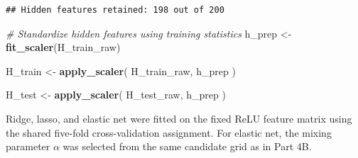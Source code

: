 \documentclass[
  11pt,
]{article}
\newenvironment{Shaded}{\begin{snugshade}}{\end{snugshade}}
\newcommand{\CommentTok}[1]{\textcolor[rgb]{0.56,0.35,0.01}{\textit{#1}}}
\newcommand{\FunctionTok}[1]{\textcolor[rgb]{0.13,0.29,0.53}{\textbf{#1}}}
\newcommand{\NormalTok}[1]{#1}
\newcommand{\OtherTok}[1]{\textcolor[rgb]{0.56,0.35,0.01}{#1}}
\begin{document}
\begin{verbatim}
## Hidden features retained: 198 out of 200
\end{verbatim}

\begin{Shaded}
\begin{Highlighting}[]
\CommentTok{\# Standardize hidden features using training statistics}
\NormalTok{h\_prep }\OtherTok{\textless{}{-}} \FunctionTok{fit\_scaler}\NormalTok{(H\_train\_raw)}

\NormalTok{H\_train }\OtherTok{\textless{}{-}} \FunctionTok{apply\_scaler}\NormalTok{(}
\NormalTok{  H\_train\_raw,}
\NormalTok{  h\_prep}
\NormalTok{)}

\NormalTok{H\_test }\OtherTok{\textless{}{-}} \FunctionTok{apply\_scaler}\NormalTok{(}
\NormalTok{  H\_test\_raw,}
\NormalTok{  h\_prep}
\NormalTok{)}
\end{Highlighting}
\end{Shaded}

Ridge, lasso, and elastic net were fitted on the fixed ReLU feature
matrix using the shared five-fold cross-validation assignment. For
elastic net, the mixing parameter \(\alpha\) was selected from the same
candidate grid as in Part 4B.
\end{document}
